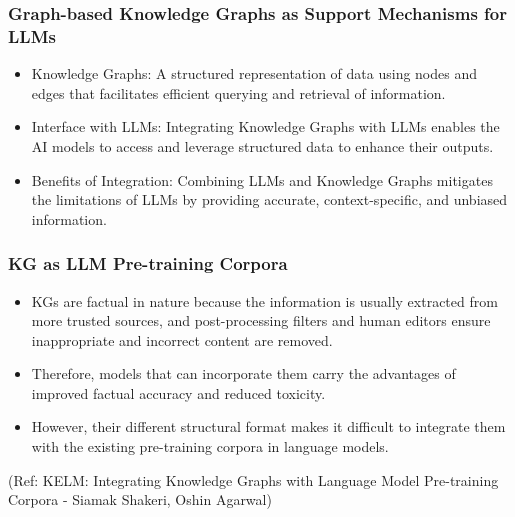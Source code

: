 \begin{frame}[fragile]\frametitle{Graph-based Knowledge Graphs as Support Mechanisms for LLMs}

\begin{itemize}
\item Knowledge Graphs: A structured representation of data using nodes and edges that facilitates efficient querying and retrieval of information.
\item Interface with LLMs: Integrating Knowledge Graphs with LLMs enables the AI models to access and leverage structured data to enhance their outputs.
\item  Benefits of Integration: Combining LLMs and Knowledge Graphs mitigates the limitations of LLMs by providing accurate, context-specific, and unbiased information.
\end{itemize}	

\end{frame}


\begin{frame}[fragile]\frametitle{KG as LLM Pre-training Corpora}

\begin{itemize}
\item KGs are factual in nature because the information is usually extracted from more trusted sources, and post-processing filters and human editors ensure inappropriate and incorrect content are removed. 
\item Therefore, models that can incorporate them carry the advantages of improved factual accuracy and reduced toxicity. 
\item However, their different structural format makes it difficult to integrate them with the existing pre-training corpora in language models.
\end{itemize}	

{\tiny (Ref: KELM: Integrating Knowledge Graphs with Language Model Pre-training Corpora - Siamak Shakeri, Oshin Agarwal)}
\end{frame}


